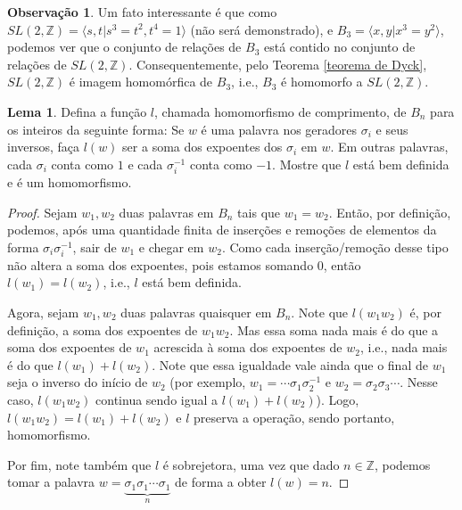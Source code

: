 \documentclass[a4paper,portuguese,11pt,twoside, leqno]{book}
\theoremstyle{definition}
\newtheorem{lemma}[theorem]{Lema}
\newtheorem{remark}{Observação}[section]
\begin{document}
	\par\vspace{0.3cm}
	
	\begin{remark}
		Um fato interessante é que como $SL(2,\mathbb{Z}) = \langle s,t | s^3 = t^2, t^4 = 1 \rangle$ (não será demonstrado), e $B_3 = \langle x,y| x^3 = y^2 \rangle$, podemos ver que o conjunto de relações de $B_3$ está contido no conjunto de relações de $SL(2,\mathbb{Z})$. Consequentemente, pelo Teorema \eqref{teorema de Dyck}, $SL(2,\mathbb{Z})$ é imagem homomórfica de $B_3$, i.e., $B_3$ é homomorfo a $SL(2,\mathbb{Z})$. 
	\end{remark}
	
	\par\vspace{0.3cm}
	
	\begin{lemma}
		\label{homomorfismo de comprimento}
		Defina a função $l$, chamada homomorfismo de comprimento, de $B_n$ para os inteiros da seguinte forma: Se $w$ é uma palavra nos geradores $\sigma_i$ e seus inversos, faça $l(w)$ ser a soma dos expoentes dos $\sigma_i$ em $w$. Em outras palavras, cada $\sigma_i$ conta como $1$ e cada $\sigma_i^{-1}$ conta como $-1$. Mostre que $l$ está bem definida e é um homomorfismo.
	\end{lemma}
	
	\begin{proof}
		Sejam $w_1,w_2$ duas palavras em $B_n$ tais que $w_1=w_2$. Então, por definição, podemos, após uma quantidade finita de inserções e remoções de elementos da forma $\sigma_i\sigma_i^{-1}$, sair de $w_1$ e chegar em $w_2$. Como cada inserção/remoção desse tipo não altera a soma dos expoentes, pois estamos somando 0, então $l(w_1)=l(w_2)$, i.e., $l$ está bem definida. 
		\par\vspace{0.3cm} Agora, sejam $w_1,w_2$ duas palavras quaisquer em $B_n$. Note que $l(w_1w_2)$ é, por definição, a soma dos expoentes de $w_1w_2$. Mas essa soma nada mais é do que a soma dos expoentes de $w_1$ acrescida à soma dos expoentes de $w_2$, i.e., nada mais é do que $l(w_1)+l(w_2)$. Note que essa igualdade vale ainda que o final de $w_1$ seja o inverso do início de $w_2$ (por exemplo, $w_1 = \cdots\sigma_1\sigma_2^{-1}$ e $w_2 = \sigma_2\sigma_3\cdots$. Nesse caso, $l(w_1w_2)$ continua sendo igual a $l(w_1) + l(w_2)$). Logo, $l(w_1w_2)=l(w_1)+l(w_2)$ e $l$ preserva a operação, sendo portanto, homomorfismo.
		\par\vspace{0.3cm} Por fim, note também que $l$ é sobrejetora, uma vez que dado $n\in\mathbb{Z}$, podemos tomar a palavra $w = \underbrace{\sigma_1\sigma_1\cdots\sigma_1}_{n}$ de forma a obter $l(w) = n$.
	\end{proof}
	
\end{document}
